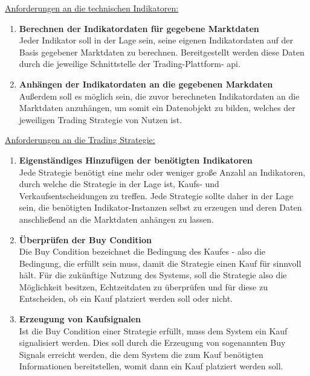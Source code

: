 \documentclass[oneside]{ausarbeitung}
\begin{document}
\underline{Anforderungen an die technischen Indikatoren:}
\begin{enumerate}
	\item \textbf{Berechnen der Indikatordaten für gegebene Marktdaten} \\
		Jeder Indikator soll in der Lage sein, seine eigenen Indikatordaten
		auf der Basis gegebener Marktdaten zu berechnen. Bereitgestellt werden
		diese Daten durch die jeweilige Schnittstelle der Trading-Plattform-
		\ac{api}. 
	\item \textbf{Anhängen der Indikatordaten an die gegebenen Markdaten} \\
		Außerdem soll es möglich sein, die zuvor berechneten Indikatordaten an
		die Marktdaten anzuhängen, um somit ein Datenobjekt zu bilden, welches
		der jeweiligen Trading Strategie von Nutzen ist. \\
\end{enumerate}

\underline{Anforderungen an die Trading Strategie:}
\begin{enumerate}
	\item \textbf{Eigenständiges Hinzufügen der benötigten Indikatoren} \\
		Jede Strategie benötigt eine mehr oder weniger große Anzahl an
		Indikatoren, durch welche die Strategie in der Lage ist, Kaufs- und
		Verkaufsentscheidungen zu treffen. Jede Strategie sollte daher in der
		Lage sein, die benötigten Indikator-Instanzen selbst zu erzeugen und
		deren Daten anschließend an die Marktdaten anhängen zu lassen.
	\item \textbf{Überprüfen der Buy Condition} \\
		Die Buy Condition bezeichnet die Bedingung des Kaufes - also die
		Bedingung, die erfüllt sein muss, damit die Strategie einen Kauf für
		sinnvoll hält. Für die zukünftige Nutzung des Systems, soll die 
		Strategie also die Möglichkeit besitzen, Echtzeitdaten zu überprüfen 
		und für diese zu Entscheiden, ob ein Kauf platziert werden soll oder 
		nicht.
	\item \textbf{Erzeugung von Kaufsignalen} \\
		Ist die Buy Condition einer Strategie erfüllt, muss dem System ein Kauf
		signalisiert werden. Dies soll durch die Erzeugung von sogenannten Buy
		Signals erreicht werden, die dem System die zum Kauf benötigten 
		Informationen bereitstellen, womit dann ein Kauf platziert werden soll.
\end{enumerate}

\end{document}
